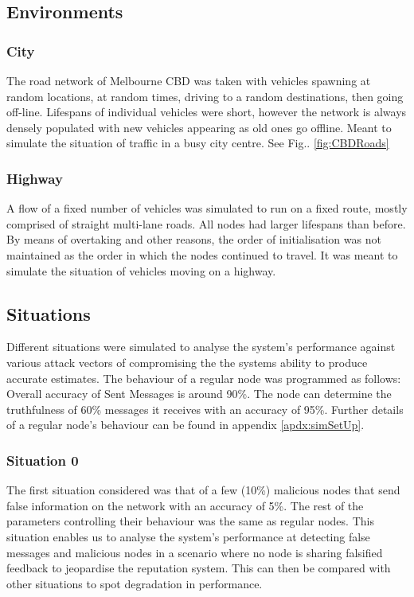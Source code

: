\documentclass[journal]{IEEEtran}
\begin{document}
\subsection{Environments}
\label{sec:Experiments:env}
\subsubsection{City}
	The road network of Melbourne CBD was taken with vehicles spawning at random locations, at random times, driving to a random destinations, then going off-line. Lifespans of individual vehicles were short, however the network is always densely populated with new vehicles appearing as old ones go offline.	Meant to simulate the situation of traffic in a busy city centre. See Fig.. \ref{fig:CBDRoads}	
\subsubsection{Highway}
	A flow of a fixed number of vehicles was simulated to run on a fixed route, mostly comprised of straight multi-lane roads. All nodes had larger lifespans than before. By means of overtaking and other reasons, the order of initialisation was not maintained as the order in which the nodes continued to travel. It was meant to simulate the situation of vehicles moving on a highway.
\subsection{Situations}
\label{sec:Experiments:sit}
Different situations were simulated to analyse the system's performance against various attack vectors of compromising the the systems ability to produce accurate estimates. The behaviour of a regular node was programmed as follows: Overall accuracy of Sent Messages is around 90\%. The node can determine the truthfulness of 60\% messages it receives with an accuracy of 95\%. %
Further details of a regular node's behaviour can be  found in appendix \ref{apdx:simSetUp}.
\subsubsection{Situation 0}
\label{sec:Experiments:sit:0}
The first situation considered was that of a few (10\%) malicious nodes that send false information on the network with an accuracy of 5\%. The rest of the parameters controlling their behaviour was the same as regular nodes. This situation enables us to analyse the system's performance at detecting false messages and malicious nodes in a scenario where no node is sharing falsified feedback to jeopardise the reputation system. This can then be compared with other situations to spot degradation in performance.
\end{document}
